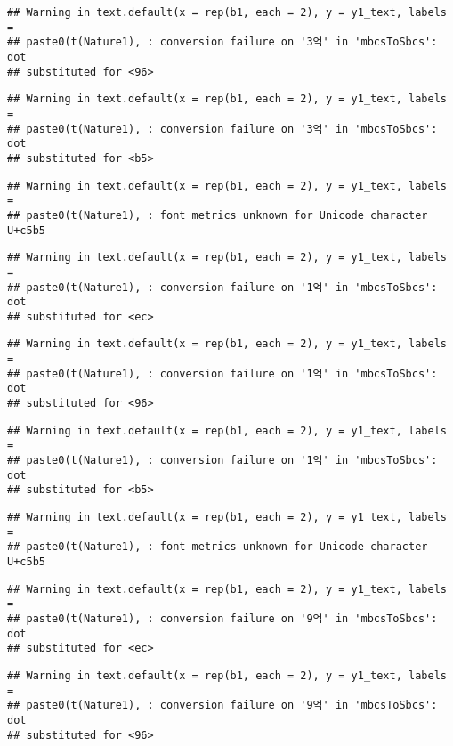 \documentclass[
]{article}
\begin{document}
\begin{verbatim}
## Warning in text.default(x = rep(b1, each = 2), y = y1_text, labels =
## paste0(t(Nature1), : conversion failure on '3억' in 'mbcsToSbcs': dot
## substituted for <96>
\end{verbatim}

\begin{verbatim}
## Warning in text.default(x = rep(b1, each = 2), y = y1_text, labels =
## paste0(t(Nature1), : conversion failure on '3억' in 'mbcsToSbcs': dot
## substituted for <b5>
\end{verbatim}

\begin{verbatim}
## Warning in text.default(x = rep(b1, each = 2), y = y1_text, labels =
## paste0(t(Nature1), : font metrics unknown for Unicode character U+c5b5
\end{verbatim}

\begin{verbatim}
## Warning in text.default(x = rep(b1, each = 2), y = y1_text, labels =
## paste0(t(Nature1), : conversion failure on '1억' in 'mbcsToSbcs': dot
## substituted for <ec>
\end{verbatim}

\begin{verbatim}
## Warning in text.default(x = rep(b1, each = 2), y = y1_text, labels =
## paste0(t(Nature1), : conversion failure on '1억' in 'mbcsToSbcs': dot
## substituted for <96>
\end{verbatim}

\begin{verbatim}
## Warning in text.default(x = rep(b1, each = 2), y = y1_text, labels =
## paste0(t(Nature1), : conversion failure on '1억' in 'mbcsToSbcs': dot
## substituted for <b5>
\end{verbatim}

\begin{verbatim}
## Warning in text.default(x = rep(b1, each = 2), y = y1_text, labels =
## paste0(t(Nature1), : font metrics unknown for Unicode character U+c5b5
\end{verbatim}

\begin{verbatim}
## Warning in text.default(x = rep(b1, each = 2), y = y1_text, labels =
## paste0(t(Nature1), : conversion failure on '9억' in 'mbcsToSbcs': dot
## substituted for <ec>
\end{verbatim}

\begin{verbatim}
## Warning in text.default(x = rep(b1, each = 2), y = y1_text, labels =
## paste0(t(Nature1), : conversion failure on '9억' in 'mbcsToSbcs': dot
## substituted for <96>
\end{verbatim}
\end{document}
